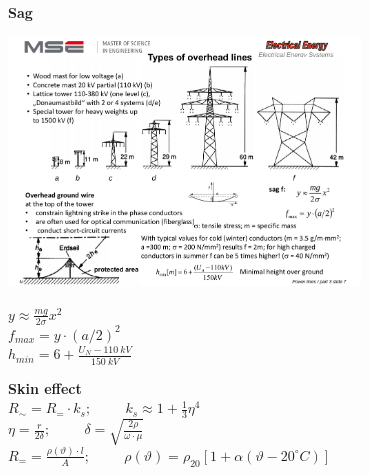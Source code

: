 	\begin{multicols}{2}
		\textbf{Sag} \\
		\begin{minipage}[lt]{5cm}
			\centering
			\includegraphics[width=0.7\textwidth]{./images/sag.pdf}
		\end{minipage}
		\begin{minipage}[rt]{5cm}
			$y \approx \frac{mg}{2\sigma}x^2$ \\
			$f_{max} = y \cdot \left(a/2\right)^2$ \\
			$h_{min} = 6 + \frac{U_N - 110~kV}{150~kV}$ 
		\end{minipage}

		\textbf{Skin effect}\\
		{\small $R_\sim = R_= \cdot k_s; \hspace{1cm} k_s \approx 1 + \frac{1}{3}\eta^4$\\
		$ \eta = \frac{r}{2\delta}; \hspace{1cm} \delta = \sqrt{\frac{2\rho}{\omega \cdot \mu}}$ \\
		$R_= = \frac{\rho(\vartheta)\cdot l}{A}; \hspace{1cm} \rho(\vartheta) = \rho_{20} [1+\alpha\left(\vartheta - 20^\circ C\right)]$\\}
	\end{multicols}
		
		
